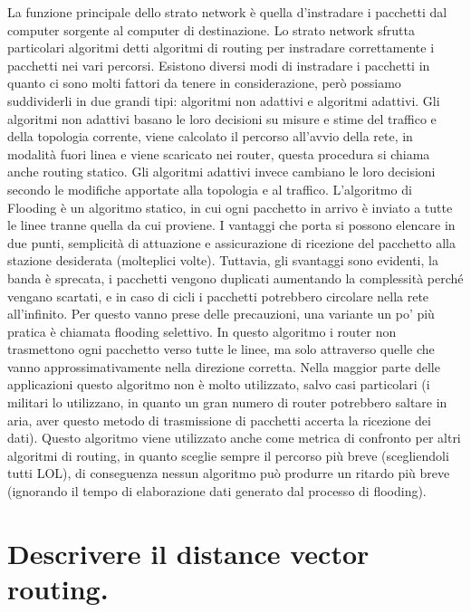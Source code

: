 La funzione principale dello strato network è quella d’instradare i pacchetti dal computer sorgente al computer di destinazione.
Lo strato network sfrutta particolari algoritmi detti algoritmi di routing per instradare correttamente i pacchetti nei vari percorsi. Esistono diversi modi di instradare i pacchetti in quanto ci sono molti fattori da tenere in considerazione, però possiamo suddividerli in due grandi tipi: algoritmi non adattivi e algoritmi adattivi.
Gli algoritmi non adattivi basano le loro decisioni su misure e stime del traffico e della topologia corrente, viene calcolato il percorso all’avvio della rete, in modalità fuori linea e viene scaricato nei router, questa procedura si chiama anche routing statico. Gli algoritmi adattivi invece cambiano le loro decisioni secondo le modifiche apportate alla topologia e al traffico.
L’algoritmo di Flooding è un algoritmo statico, in cui ogni pacchetto in arrivo è inviato a tutte le linee tranne quella da cui proviene. I vantaggi che porta si possono elencare in due punti, semplicità di attuazione e assicurazione di ricezione del pacchetto alla stazione desiderata (molteplici volte).
Tuttavia, gli svantaggi sono evidenti, la banda è sprecata, i pacchetti vengono duplicati aumentando la complessità perché vengano scartati, e in caso di cicli i pacchetti potrebbero circolare nella rete all’infinito.
Per questo vanno prese delle precauzioni, una variante un po’ più pratica è chiamata flooding selettivo. In questo algoritmo i router non trasmettono ogni pacchetto verso tutte le linee, ma solo attraverso quelle che vanno approssimativamente nella direzione corretta.
Nella maggior parte delle applicazioni questo algoritmo non è molto utilizzato, salvo casi particolari (i militari lo utilizzano, in quanto un gran numero di router potrebbero saltare in aria, aver questo metodo di trasmissione di pacchetti accerta la ricezione dei dati).
Questo algoritmo viene utilizzato anche come metrica di confronto per altri algoritmi di routing, in quanto sceglie sempre il percorso più breve (scegliendoli tutti LOL), di conseguenza nessun algoritmo può produrre un ritardo più breve (ignorando il tempo di elaborazione dati generato dal processo di flooding).
 

\section{Descrivere il distance vector routing.}

